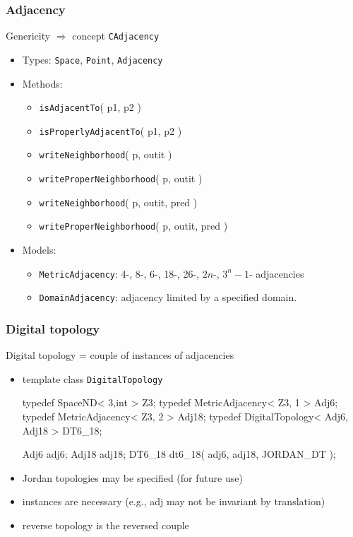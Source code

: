 \documentclass[pdftex,francais]{beamer}
\begin{document}
\begin{frame}
  \frametitle{Adjacency}

  \alert{Genericity} $\Rightarrow$ concept \alert{\texttt{CAdjacency}}

  \begin{itemize}
  \item Types: \texttt{Space}, \texttt{Point}, \texttt{Adjacency}
  \item Methods: 
    \begin{itemize}
    \item \texttt{isAdjacentTo}( p1, p2 )
    \item \texttt{isProperlyAdjacentTo}( p1, p2 )
    \item \texttt{writeNeighborhood}( p, outit )
    \item \texttt{writeProperNeighborhood}( p, outit )
    \item \texttt{writeNeighborhood}( p, outit, pred )
    \item \texttt{writeProperNeighborhood}( p, outit, pred )
    \end{itemize}
  \item Models: 
    \begin{itemize}
    \item \texttt{MetricAdjacency}: 4-, 8-, 6-, 18-, 26-, $2n$-, $3^n-1$- adjacencies
    \item \texttt{DomainAdjacency}: adjacency limited by a specified domain.
    \end{itemize}
  \end{itemize}
\end{frame}

\begin{frame}[fragile]
  \frametitle{Digital topology}
  \alert{Digital topology} = couple of instances of adjacencies

  \begin{itemize}
  \item template class \texttt{DigitalTopology}
    \scriptsize
    \begin{semiverbatim}
 typedef SpaceND< 3,int > Z3;
 typedef MetricAdjacency< Z3, 1 > Adj6;
 typedef MetricAdjacency< Z3, 2 > Adj18;
 typedef DigitalTopology< Adj6, Adj18 > DT6_18;

 Adj6 adj6;
 Adj18 adj18;
 DT6_18 dt6_18( adj6, adj18, JORDAN_DT );
    \end{semiverbatim}
    \normalsize
  \item Jordan topologies may be specified (for future use)
  \item instances are necessary (e.g., adj may not be invariant by translation)
  \item reverse topology is the reversed couple
  \end{itemize}
\end{frame}
\end{document}
